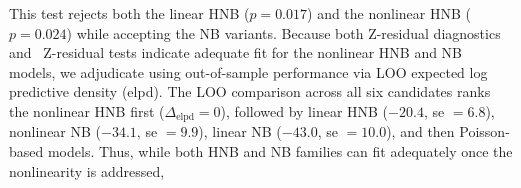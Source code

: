  This test rejects both the linear HNB ($p=0.017$) and the nonlinear HNB ($p=0.024$) while accepting the NB variants. Because both Z-residual diagnostics and \PPC\ Z-residual tests indicate adequate fit for the nonlinear HNB and NB models, we adjudicate using out-of-sample performance via LOO expected log predictive density (elpd). The LOO comparison across all six candidates ranks the nonlinear HNB first ($\Delta_{\text{elpd}}=0$), followed by linear HNB ($-20.4$, se $=6.8$), nonlinear NB ($-34.1$, se $=9.9$), linear NB ($-43.0$, se $=10.0$), and then Poisson-based models. Thus, while both HNB and NB families can fit adequately once the nonlinearity is addressed,  
